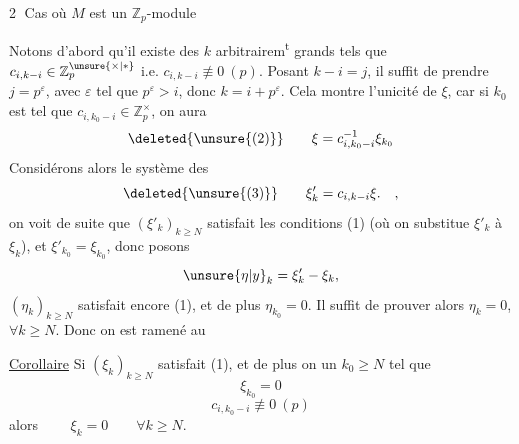 \textcircled{2} Cas où $M$ est un $\mathbb Z_p$-module

Notons d'abord qu'il existe des $k$ arbitrairem\textsuperscript{t} grands tels que $c_{i,k-i}\in\mathbb Z_p^{\unsure{\times|*}}$ i.e. $c_{i,k-i}\not\equiv0\ (p)$. Posant $k-i=j$, il suffit de prendre $j=p^\varepsilon$, avec $\varepsilon$ tel que $p^\varepsilon>i$, donc $k=i+p^\varepsilon$. Cela montre l'unicité de $\xi$, car si $k_0$ est tel que $c_{i,k_0-i}\in\mathbb Z_p^\times$, on aura
\[
\deleted{\unsure{(2)}}\qquad \xi=c_{i,k_0-i}^{-1}\xi_{k_0}
\]
Considérons alors le système des
\[
\deleted{\unsure{(3)}}\qquad \xi'_k=c_{i,k-i}\xi.\quad,
\]
on voit de suite que  $(\xi'_k)_{k\geq N}$ satisfait  les conditions (1)\unsure{,|{}} (où on substitue $\xi'_k$ à $\xi_k$), et $\xi'_{k_0}=\xi_{k_0}$, donc posons
\[
\unsure{\eta|y}_k=\xi'_k-\xi_k,
\]
 $(\eta_k)_{k\geq N}$ satisfait encore (1), et de plus $\eta_{k_0}=0$. Il suffit de prouver alors $\eta_k=0$,  $\forall k\geq N$. Donc on est ramené au

\uline{Corollaire} Si $(\xi_k)_{k\geq N}$  satisfait (1), et  de plus  on  un $k_0\geq N$ tel que
\[
\xi_{k_0}=0\tag*{$(1')$}
\]
\[
c_{i,k_0-i}\not\equiv0\ (p)\tag*{(3)}
\]
alors $\qquad \xi_k=0\qquad\forall k\geq N$.

